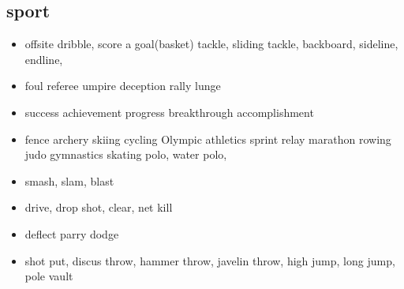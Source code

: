 \documentclass[a4paper,11pt,twoside]{book}
\begin{document}
\subsection{sport}
\begin{itemize}
	\item offsite dribble, score a goal(basket) tackle, sliding tackle, backboard, sideline, endline, 
	
	\item foul referee umpire deception rally lunge 

	\item success achievement progress breakthrough accomplishment
	
	\item fence archery skiing cycling Olympic athletics sprint relay marathon rowing judo gymnastics skating polo, water polo, 
	
	\item smash, slam, blast
	
	\item drive, drop shot, clear, net kill 
	
	\item deflect parry dodge
	 
	\item shot put, discus throw, hammer throw, javelin throw, high jump, long jump, pole vault
\end{itemize}
\end{document}
